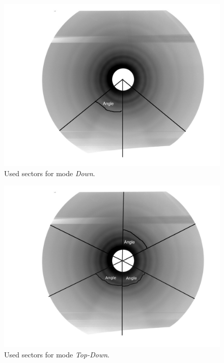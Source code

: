 \begin{figure}
\includegraphics[width=12cm]{down.jpg}
\caption{Used sectors for mode \textit{Down}. }
\label{modedown} 
\end{figure} 

\begin{figure}
\includegraphics[width=12cm]{topdown.jpg}
\caption{Used sectors for mode \textit{Top-Down}. }
\label{modetopdown} 
\end{figure} 





